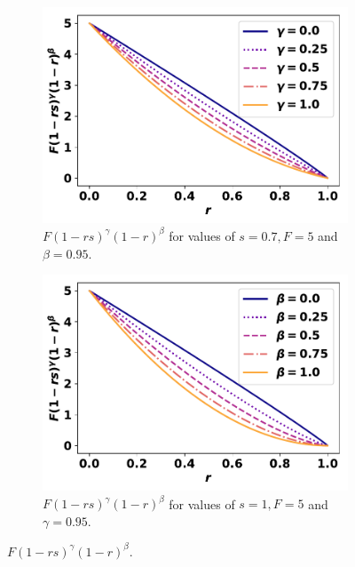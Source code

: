 \documentclass[10pt]{article}
\begin{document}
\begin{figure}[h]
\begin{center}
    \begin{subfigure}{0.40\textwidth}
        \includegraphics[width=\linewidth]{images/gammas_curve.pdf}
        \caption{\(F (1 - rs)^{\gamma} (1 - r)^{\beta}\) for values of \(s=0.7, 
        			F=5\) and \(\beta=0.95\).}
    \end{subfigure}
    \begin{subfigure}{0.40\textwidth}
        \includegraphics[width=\linewidth]{images/betas_curve.pdf}
        \caption{\(F(1 - rs)^{\gamma} (1 - r)^{\beta}\) for values of \(s=1, F=5\)
        		 	and \(\gamma=0.95\).}
    \end{subfigure}
\caption{\(F (1 - rs)^{\gamma} (1 - r)^{\beta}\).}\label{fig:CostCurves}
\end{center}
\end{figure}
\end{document}
